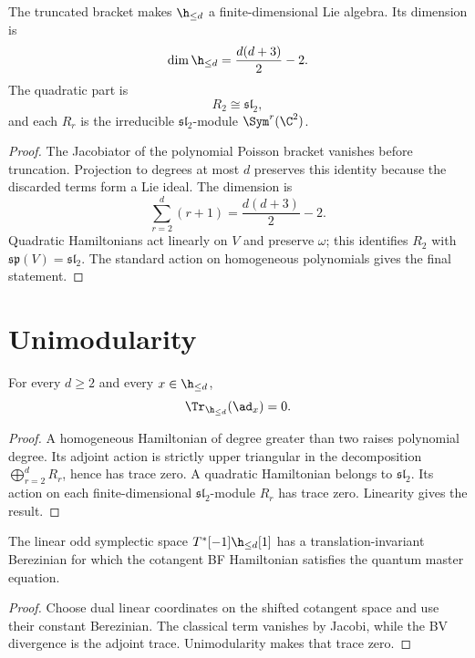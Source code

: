 \begin{theorem}
The truncated bracket makes $\h_{\le d}$ a finite-dimensional Lie algebra.  Its dimension is
\[
 \dim\h_{\le d}=\frac{d(d+3)}2-2.
\]
The quadratic part is
\[
 R_2\cong\mathfrak{sl}_2,
\]
and each $R_r$ is the irreducible $\mathfrak{sl}_2$-module $\Sym^r(\C^2)$.
\end{theorem}
\begin{proof}
The Jacobiator of the polynomial Poisson bracket vanishes before truncation.  Projection to degrees at most $d$ preserves this identity because the discarded terms form a Lie ideal.  The dimension is
\[
 \sum_{r=2}^{d}(r+1)
 =\frac{d(d+3)}2-2.
\]
Quadratic Hamiltonians act linearly on $V$ and preserve $\omega$; this identifies $R_2$ with $\mathfrak{sp}(V)=\mathfrak{sl}_2$.  The standard action on homogeneous polynomials gives the final statement.
\end{proof}

\section{Unimodularity}
\begin{theorem}
For every $d\ge2$ and every $x\in\h_{\le d}$,
\[
 \Tr_{\h_{\le d}}(\ad_x)=0.
\]
\end{theorem}
\begin{proof}
A homogeneous Hamiltonian of degree greater than two raises polynomial degree.  Its adjoint action is strictly upper triangular in the decomposition $\bigoplus_{r=2}^{d}R_r$, hence has trace zero.  A quadratic Hamiltonian belongs to $\mathfrak{sl}_2$.  Its action on each finite-dimensional $\mathfrak{sl}_2$-module $R_r$ has trace zero.  Linearity gives the result.
\end{proof}

\begin{corollary}
The linear odd symplectic space $T^*[-1]\h_{\le d}[1]$ has a translation-invariant Berezinian for which the cotangent BF Hamiltonian satisfies the quantum master equation.
\end{corollary}
\begin{proof}
Choose dual linear coordinates on the shifted cotangent space and use their constant Berezinian.  The classical term vanishes by Jacobi, while the BV divergence is the adjoint trace.  Unimodularity makes that trace zero.
\end{proof}

